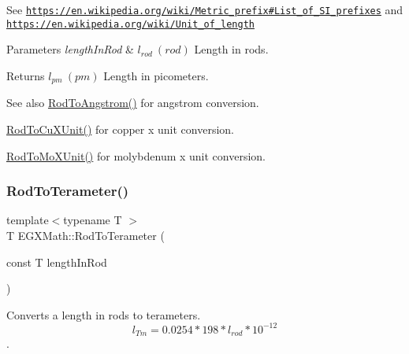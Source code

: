 See \href{https://en.wikipedia.org/wiki/Metric_prefix#List_of_SI_prefixes}{\tt https\+://en.\+wikipedia.\+org/wiki/\+Metric\+\_\+prefix\#\+List\+\_\+of\+\_\+\+S\+I\+\_\+prefixes} and \href{https://en.wikipedia.org/wiki/Unit_of_length}{\tt https\+://en.\+wikipedia.\+org/wiki/\+Unit\+\_\+of\+\_\+length} 
\begin{DoxyParams}{Parameters}
{\em length\+In\+Rod} & $ l_{rod}\ (rod)$ Length in rods. \\
\hline
\end{DoxyParams}
\begin{DoxyReturn}{Returns}
$ l_{pm}\ (pm)$ Length in picometers. 
\end{DoxyReturn}
\begin{DoxySeeAlso}{See also}
\mbox{\hyperlink{group___e_g_x_math-_conversions-_length_conversions-_surveyors-_rod-_non-_s_i_ga079b9122c8747685d7057ec05fefdb7f}{Rod\+To\+Angstrom()}} for angstrom conversion. 

\mbox{\hyperlink{group___e_g_x_math-_conversions-_length_conversions-_surveyors-_rod-_non-_s_i_gac344dc1fbafaa0451704947bf33a8594}{Rod\+To\+Cu\+X\+Unit()}} for copper x unit conversion. 

\mbox{\hyperlink{group___e_g_x_math-_conversions-_length_conversions-_surveyors-_rod-_non-_s_i_gac5c3c27eea891ef32353d16c6b8c57ab}{Rod\+To\+Mo\+X\+Unit()}} for molybdenum x unit conversion. 
\end{DoxySeeAlso}
\mbox{\label{group___e_g_x_math-_conversions-_length_conversions-_surveyors-_rod-_s_i_ga3a9ef9cdcea7b3d53cf5020bce58d117}} 
\subsubsection{\texorpdfstring{Rod\+To\+Terameter()}{RodToTerameter()}}
{\footnotesize\ttfamily template$<$typename T $>$ \\
T E\+G\+X\+Math\+::\+Rod\+To\+Terameter (\begin{DoxyParamCaption}\item[{const T}]{length\+In\+Rod }\end{DoxyParamCaption})}



Converts a length in rods to terameters. \[ l_{Tm}=0.0254 * 198 * l_{rod} * 10^{-12} \]. 


